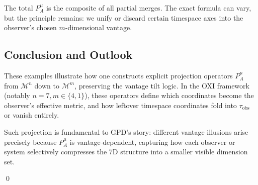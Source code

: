 \documentclass{article}
\begin{document}
The total $P^{\mu}_{A}$ is the composite of all partial merges. The exact formula can vary, but the principle remains: we unify or discard certain timespace axes into the observer’s chosen $m$-dimensional vantage.

\subsection{Conclusion and Outlook}

These examples illustrate how one constructs explicit projection operators $P^{\mu}_{A}$ from $\mathcal{M}^n$ down to $\mathcal{M}^m$, preserving the vantage tilt logic. In the OXI framework (notably $n=7, m\in\{4,1\}$), these operators define which coordinates become the observer’s effective metric, and how leftover timespace coordinates fold into $\tau_{\text{obs}}$ or vanish entirely.

Such projection is fundamental to GPD’s story: different vantage illusions arise precisely because $P^{\mu}_{A}$ is vantage-dependent, capturing how each observer or system selectively compresses the 7D structure into a smaller visible dimension set.

\qed
\end{document}
